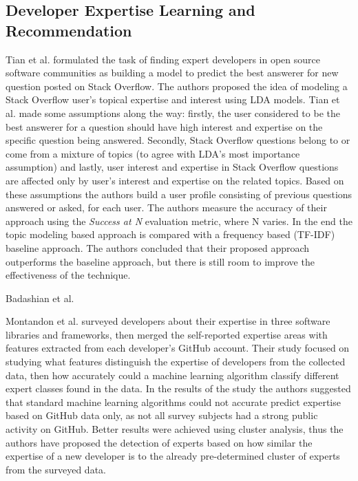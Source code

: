     \subsection{Developer Expertise Learning and Recommendation}
        
        Tian et al. \cite{tian2013predicting} formulated the task of finding expert developers in open source software communities as building a model to predict the best answerer for new question posted on Stack Overflow. The authors proposed the idea of modeling a Stack Overflow user's topical expertise and interest using LDA models. Tian et al. made some assumptions along the way: firstly, the user considered to be the best answerer for a question should have high interest and expertise on the specific question being answered. Secondly, Stack Overflow questions belong to or come from a mixture of topics (to agree with LDA's most importance assumption) and lastly, user interest and expertise in Stack Overflow questions are affected only by user's interest and expertise on the related topics. Based on these assumptions the authors build a user profile consisting of previous questions answered or asked, for each user. The authors measure the accuracy of their approach using the \emph{Success at N} evaluation metric, where N varies. In the end the topic modeling based approach is compared with a frequency based (TF-IDF) baseline approach. The authors concluded that their proposed approach outperforms the baseline approach, but there is still room to improve the effectiveness of the technique.
        
        Badashian et al. \cite{badashian2016crowdsourced}
        
        Montandon et al. \cite{montandon2019identifying} surveyed developers about their expertise in three software libraries and frameworks, then merged the self-reported expertise areas with features extracted from each developer's GitHub account. Their study focused on studying what features distinguish the expertise of developers from the collected data, then how accurately could a machine learning algorithm classify different expert classes found in the data. In the results of the study the authors suggested that standard machine learning algorithms could not accurate predict expertise based on GitHub data only, as not all survey subjects had a strong public activity on GitHub. Better results were achieved using cluster analysis, thus the authors have proposed the detection of experts based on how similar the expertise of a new developer is to the already pre-determined cluster of experts from the surveyed data.
        

